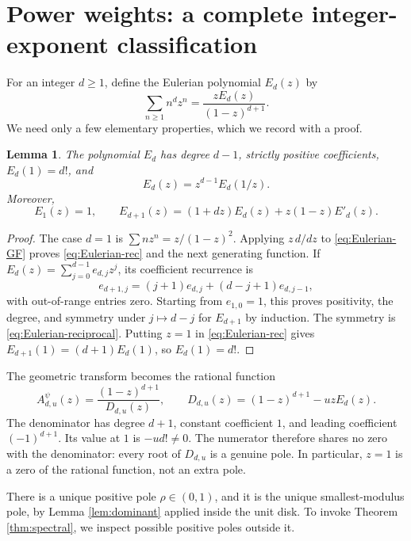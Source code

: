 \documentclass[11pt,letterpaper]{article}
\newtheorem{lemma}[theorem]{Lemma}
\theoremstyle{definition}
\numberwithin{equation}{section}
\begin{document}
\section{Power weights: a complete integer-exponent classification}
\label{sec:power}

For an integer $d\ge1$, define the Eulerian polynomial $E_d(z)$ by
\begin{equation}\label{eq:Eulerian-GF}
\sum_{n\ge1}n^d z^n=\frac{zE_d(z)}{(1-z)^{d+1}}.
\end{equation}
We need only a few elementary properties, which we record with a proof.

\begin{lemma}\label{lem:Eulerian}
The polynomial $E_d$ has degree $d-1$, strictly positive coefficients,
$E_d(1)=d!$, and
\begin{equation}\label{eq:Eulerian-reciprocal}
E_d(z)=z^{d-1}E_d(1/z).
\end{equation}
Moreover,
\begin{equation}\label{eq:Eulerian-rec}
E_1(z)=1,\qquad
E_{d+1}(z)=(1+dz)E_d(z)+z(1-z)E'_d(z).
\end{equation}
\end{lemma}
\begin{proof}
The case $d=1$ is $\sum n z^n=z/(1-z)^2$.
Applying $z\,d/dz$ to \eqref{eq:Eulerian-GF} proves
\eqref{eq:Eulerian-rec} and the next generating function.
If $E_d(z)=\sum_{j=0}^{d-1}e_{d,j}z^j$, its coefficient recurrence is
\[
e_{d+1,j}=(j+1)e_{d,j}+(d-j+1)e_{d,j-1},
\]
with out-of-range entries zero. Starting from $e_{1,0}=1$, this proves
positivity, the degree, and symmetry under $j\mapsto d-j$ for $E_{d+1}$
by induction. The symmetry is \eqref{eq:Eulerian-reciprocal}.
Putting $z=1$ in \eqref{eq:Eulerian-rec} gives
$E_{d+1}(1)=(d+1)E_d(1)$, so $E_d(1)=d!$.
\end{proof}

The geometric transform becomes the rational function
\begin{equation}\label{eq:power-rational}
A^\psi_{d,u}(z)=\frac{(1-z)^{d+1}}{D_{d,u}(z)},\qquad
D_{d,u}(z)=(1-z)^{d+1}-uzE_d(z).
\end{equation}
The denominator has degree $d+1$, constant coefficient $1$, and leading
coefficient $(-1)^{d+1}$. Its value at $1$ is $-ud!\ne0$.
The numerator therefore shares no zero with the denominator: every root
of $D_{d,u}$ is a genuine pole. In particular, $z=1$ is a zero of the
rational function, not an extra pole.

There is a unique positive pole $\rho\in(0,1)$, and it is the unique
smallest-modulus pole, by Lemma \ref{lem:dominant} applied inside the
unit disk. To invoke Theorem \ref{thm:spectral}, we inspect possible
positive poles outside it.
\end{document}
